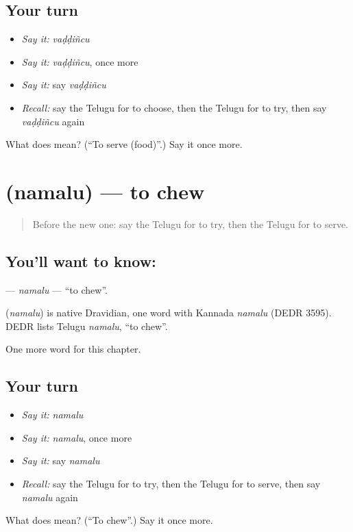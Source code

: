 \subsection*{Your turn}
\begin{itemize}
\raggedright
  \item \emph{Say it:} \emph{vaḍḍiñcu}
  \item \emph{Say it:} \emph{vaḍḍiñcu}, once more
  \item \emph{Say it:} say \emph{vaḍḍiñcu}
  \item \emph{Recall:} say the Telugu for to choose, then the Telugu for to try, then say \emph{vaḍḍiñcu} again
\end{itemize}

\begin{tcolorbox}[breakable,colback=teal!4,colframe=teal!35!black,title={Before you move on}]
What does  mean? (\textquotedblleft{}To serve (food)\textquotedblright{}.) Say it once more.
\end{tcolorbox}
\section[\texorpdfstring{\te{నమలు} (namalu)}{నమలు (namalu)}]{ (namalu) — to chew}

\label{lesson:TE-C200-namalu}



\begin{quote}
Before the new one: say the Telugu for to try, then the Telugu for to serve.
\end{quote}

\subsection*{You'll want to know: }
\textbf{} — \emph{namalu} — \textquotedblleft{}to chew\textquotedblright{}.

\begin{cousinweb}
\textbf{} (\emph{namalu}) is native Dravidian, one word with Kannada \emph{namalu} (DEDR 3595). DEDR lists Telugu \emph{namalu}, \textquotedblleft{}to chew\textquotedblright{}.
\end{cousinweb}

\begin{grammarlens}[title={What you've built}]
One more word for this chapter.
\end{grammarlens}

\subsection*{Your turn}
\begin{itemize}
\raggedright
  \item \emph{Say it:} \emph{namalu}
  \item \emph{Say it:} \emph{namalu}, once more
  \item \emph{Say it:} say \emph{namalu}
  \item \emph{Recall:} say the Telugu for to try, then the Telugu for to serve, then say \emph{namalu} again
\end{itemize}

\begin{tcolorbox}[breakable,colback=teal!4,colframe=teal!35!black,title={Before you move on}]
What does  mean? (\textquotedblleft{}To chew\textquotedblright{}.) Say it once more.
\end{tcolorbox}
